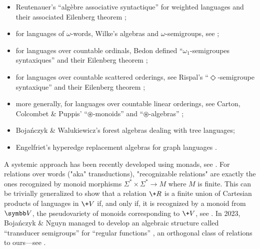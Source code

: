 \begin{itemize}
	\item Reutenauer's ``algèbre associative syntactique'' for weighted languages
		\cite[Théorème I.2.1, p.~451]{reutenauer_series_1980} and their associated Eilenberg theorem \cite[Théorème III.1.1, p.~469]{reutenauer_series_1980};
	\item for languages of $\omega$-words, Wilke's algebras and $\omega$-semigroups,
		see \cite[\S II, pp.~75--131 \& \S VI, pp.~265--306]{perrin_infinite_2004};
	\item for languages over countable ordinals, Bedon defined ``$\omega_1$-semi\-groupes syntaxiques'' \cite[\S3, pp.~49--109]{bedon_langages_1998} and their Eilenberg theorem
		\cite[Theorem 22, p.~62]{bedon_eilenberg_1998};
	\item for languages over countable scattered orderings, see Rispal's ``$\Diamond$-semigroupe syntaxique'' \cite[\S 4.4, pp.~82--86]{rispal_automates_2004} and their Eilenberg theorem
		\cite[Theorem 6, p.~144]{bedon_schutzenberger_2005};
	\item more generally, for languages over countable linear orderings, see Carton, Colcombet \& Puppis' ``$\circledast$-monoids'' and ``$\circledast$-algebras''
		\cite[\S 3, p.~7]{carton_algebraic_2018};
	\item Bojańczyk \& Walukiewicz's 
		forest algebras \cite[\S 1.3, p.~4]{bojanczyk_forest_2008} \cite[\S 5, p.~159]{bojanczyk_languages_2020}
		dealing with tree languages;
	\item Engelfriet's hyperedge replacement algebras for graph languages
		\cite[\S 2.3, p.~100]{courcelle_graph_2012} \cite[\S 6.2, p.~194]{bojanczyk_recognisable_2015}.
\end{itemize}

A systemic approach has been recently developed using monads, see .
For relations over words ("aka" transductions), "recognizable 
relations" are exactly the ones recognized by monoid morphisms $\Sigma^* \times \Sigma^* \to M$ 
where $M$ is finite. This can be trivially generalized to show 
that a relation $\+R$ is a finite union of Cartesian products of languages in $\+V$ if, and only 
if, it is recognized by a monoid from $\B{V}$, the pseudovariety of monoids corresponding to
$\+V$, see .
In 2023, Bojańczyk \& Nguyn 
managed to develop an algebraic structure called ``transducer semigroups'' for ``regular functions'' \cite[Theorem 3.2, p.~6]{bojanczyk_algebraic_2023}, an 
orthogonal class of relations to ours---see .

